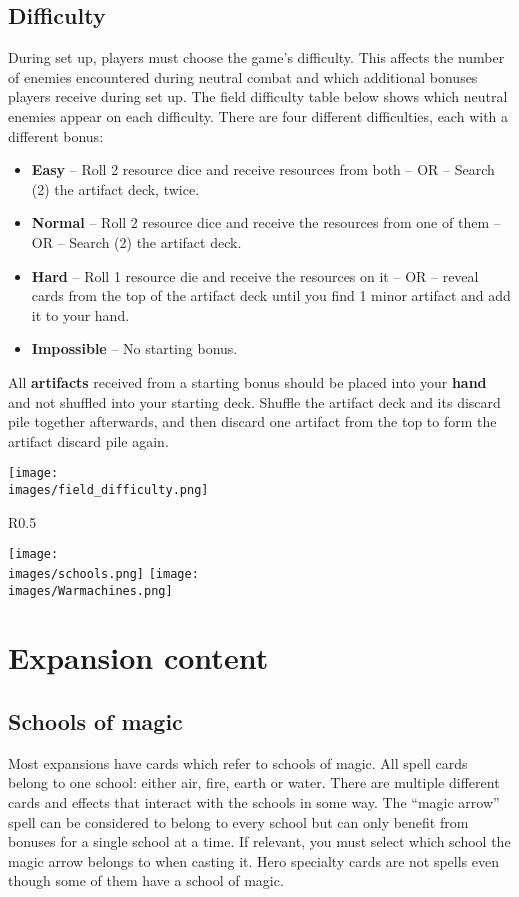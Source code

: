 \documentclass[12pt]{article}
\def\assets{assets}
\def\images{\assets/images}
\begin{document}
\subsection*{\hypertarget{Difficulty}{Difficulty}}
During set up, players must choose the game’s difficulty. This affects the number of enemies
encountered during neutral combat and which additional bonuses players receive during set up. The field difficulty table below shows which neutral enemies appear on each difficulty. There are four different difficulties, each with a different bonus:
\begin{itemize}
    \item \textbf{Easy} – Roll 2 resource dice and receive resources from both – OR – Search (2) the artifact deck, twice.
    \item \textbf{Normal} – Roll 2 resource dice and receive the resources from one of them – OR – Search (2) the artifact deck.
    \item \textbf{Hard} – Roll 1 resource die and receive the resources on it – OR – reveal cards from the top of the artifact deck until you find 1 minor artifact and add it to your hand.
    \item \textbf{Impossible} – No starting bonus.
\end{itemize}
All \textbf{artifacts} received from a starting bonus should be placed into your \textbf{hand} and not shuffled into your starting deck. Shuffle the artifact deck and its discard pile together afterwards, and then discard one artifact from the top to form the artifact discard pile again.
\begin{center}
\texttt{[image: \\images/field\_difficulty.png]}
\end{center}
\clearpage
\begin{wrapfigure}{R}{0.5\textwidth}
    \begin{center}
    \texttt{[image: \\images/schools.png]}
    \texttt{[image: \\images/Warmachines.png]}
    \end{center}
\end{wrapfigure}
\section{Expansion content}
\subsection*{Schools of magic}
Most expansions have cards which refer to schools of magic. All spell cards belong to one school: either air, fire, earth or water. There are multiple different cards and effects that interact with the schools in some way. The “magic arrow” spell can be considered to belong to every school but can only benefit from bonuses for a single school at a time. If relevant, you must select which school the magic arrow belongs to when casting it. Hero specialty cards are not spells even though some of them have a school of magic.
\end{document}
